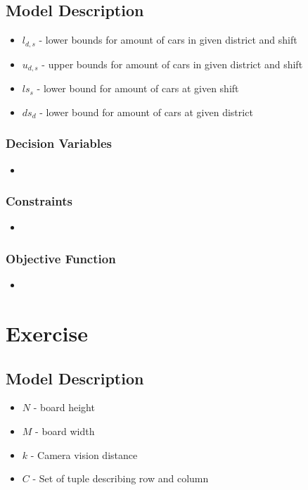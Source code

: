 \documentclass[11pt]{article}
\begin{document}
\subsection{Model Description}
\begin{itemize}
    \item $l_{d, s}$ - lower bounds for amount of cars in given district and shift
    \item $u_{d, s}$ - upper bounds for amount of cars in given district and shift
    \item $ls_{s}$ - lower bound for amount of cars at given shift
    \item $ds_{d}$ - lower bound for amount of cars at given district
\end{itemize}
\subsubsection*{Decision Variables}
\begin{itemize}
    \item 
\end{itemize}
\subsubsection*{Constraints}
\begin{itemize}
    \item 
\end{itemize}
\subsubsection*{Objective Function}
\begin{itemize}
    \item 
\end{itemize}


\section{Exercise}
\subsection{Model Description}
\begin{itemize}
    \item $N$ - board height
    \item $M$ - board width
    \item $k$ - Camera vision distance
    \item $C$ - Set of tuple describing row and column
\end{itemize}
\end{document}
